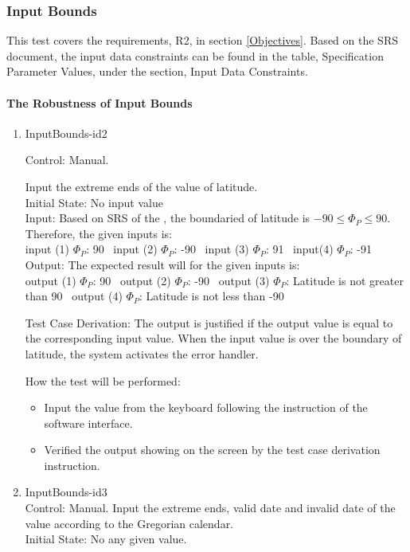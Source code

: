 \documentclass[12pt, titlepage]{article}
\begin{document}
\subsubsection{Input Bounds}

This test covers the requirements, R2, in section \ref{Objectives}. Based on
the SRS document\cite{YS2019}, the input data constraints can be found in the
table, Specification Parameter Values, under the section, Input Data
Constraints.


\paragraph{The Robustness of Input Bounds} 
\begin{enumerate}
\item{InputBounds-id2\\} 

Control: Manual. 

Input the extreme ends of the value of latitude.\\
Initial State: No input value\\
Input: Based on SRS\cite{YS2019} of the \progname\cite{YS2019}, the boundaried
of latitude is $-90 \leq \Phi_P \leq 90$.\\
Therefore, the given inputs is:\\
input (1) $\Phi_P$: 90 
~input (2) $\Phi_P$: -90 
~input (3) $\Phi_P$: 91 
~input(4) $\Phi_P$: -91\\ 

Output: The expected result will for the given inputs is:\\
output (1) $\Phi_P$: 90 
~output (2) $\Phi_P$: -90 
~output (3) $\Phi_P$: Latitude is not greater than 90 
~output (4) $\Phi_P$: Latitude is not less than -90\\


Test Case Derivation: The output is justified if the output value is equal to
the corresponding input value. When the input value is over the boundary 
of latitude, the system activates the error handler. \\ 

How the test will be performed:

\begin{itemize} 

\item Input the value from the keyboard following the instruction of the
software interface.
\item Verified the output showing on the screen by the test case derivation
instruction.
\end{itemize}
\item{InputBounds-id3\\}
Control: Manual. 
 Input the extreme ends, valid date and invalid date of the value according to the Gregorian calendar. \\
Initial State: No any given value.\\


\end{enumerate}
\end{document}
